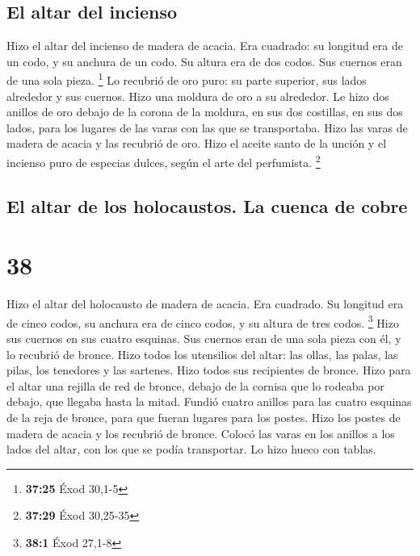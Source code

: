 \hypertarget{el-altar-del-incienso}{%
\subsection{El altar del incienso}\label{el-altar-del-incienso}}

 Hizo el altar del incienso de madera de acacia. Era
cuadrado: su longitud era de un codo, y su anchura de un codo. Su altura
era de dos codos. Sus cuernos eran de una sola pieza. \footnote{\textbf{37:25}
  Éxod 30,1-5}  Lo recubrió de oro puro: su parte
superior, sus lados alrededor y sus cuernos. Hizo una moldura de oro a
su alrededor.  Le hizo dos anillos de oro debajo de la
corona de la moldura, en sus dos costillas, en sus dos lados, para los
lugares de las varas con las que se transportaba.  Hizo
las varas de madera de acacia y las recubrió de oro. 
Hizo el aceite santo de la unción y el incienso puro de especias dulces,
según el arte del perfumista. \footnote{\textbf{37:29} Éxod 30,25-35}

\hypertarget{el-altar-de-los-holocaustos.-la-cuenca-de-cobre}{%
\subsection{El altar de los holocaustos. La cuenca de
cobre}\label{el-altar-de-los-holocaustos.-la-cuenca-de-cobre}}

\hypertarget{section-37}{%
\section{38}\label{section-37}}

 Hizo el altar del holocausto de madera de acacia. Era
cuadrado. Su longitud era de cinco codos, su anchura era de cinco codos,
y su altura de tres codos. \footnote{\textbf{38:1} Éxod 27,1-8}
 Hizo sus cuernos en sus cuatro esquinas. Sus cuernos eran
de una sola pieza con él, y lo recubrió de bronce.  Hizo
todos los utensilios del altar: las ollas, las palas, las pilas, los
tenedores y las sartenes. Hizo todos sus recipientes de bronce.
 Hizo para el altar una rejilla de red de bronce, debajo
de la cornisa que lo rodeaba por debajo, que llegaba hasta la mitad.
 Fundió cuatro anillos para las cuatro esquinas de la reja
de bronce, para que fueran lugares para los postes.  Hizo
los postes de madera de acacia y los recubrió de bronce. 
Colocó las varas en los anillos a los lados del altar, con los que se
podía transportar. Lo hizo hueco con tablas.

